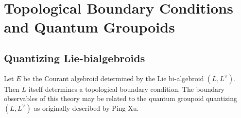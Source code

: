 \section{Topological Boundary Conditions and Quantum Groupoids}


\subsection{Quantizing Lie-bialgebroids}

Let $E$ be the Courant algebroid determined by the Lie bi-algebroid $(L,L^\vee)$.  Then $L$ itself determines a topological boundary condition. The boundary observables of this theory may be related to the quantum groupoid quantizing $(L, L^\vee)$ as originally described by Ping Xu.

